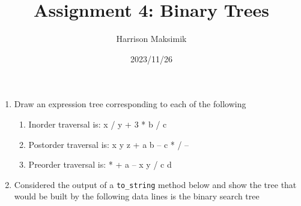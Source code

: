 \documentclass{article}
\title{Assignment 4: Binary Trees}
\author{Harrison Maksimik}
\date{2023/11/26}
\begin{document}
\maketitle
\begin{enumerate}
\item
  Draw an expression tree corresponding to each of the following
  
  \begin{enumerate}
  \item
    Inorder traversal is: x / y + 3 * b / c
    
  \item
    Postorder traversal is: x y z + a b – c * / –

  \item
    Preorder traversal is: * + a – x y / c d

  \end{enumerate}
\item
  Considered the output of a \texttt{to\_string} method below and show the tree that would be built by the following data lines is the binary search tree

\end{enumerate}
\end{document}
